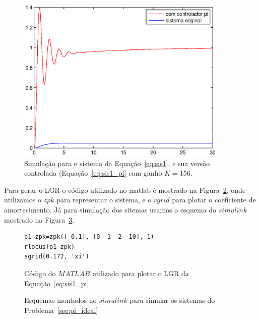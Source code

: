 \documentclass[a4paper]{article}
\begin{document}
\begin{figure}[ht]
   \centering
   \includegraphics[width=0.9\textwidth]{p1_sim}
   \caption{Simulação para o sistema da Equação~\ref{eq:sis1},
      e sua versão controlada (Equação~\ref{eq:sis1_pi} com ganho
      $K=156$.}
   \label{fig:sis1_sim}
\end{figure}

Para gerar o LGR o código utilizado no matlab é mostrado na Figura~\ref{verb:sis1_lgr},
onde utilizamos o $zpk$ para representar o sistema, e o $rgrid$ para plotar o coeficiente
de amortecimento. Já para simulação dos sitemas usamos o esquema do $simulink$ mostrado
na Figura~\ref{fig:sis1_simulink}.

\begin{figure}[ht]
\begin{verbatim}
p1_zpk=zpk([-0.1], [0 -1 -2 -10], 1)
rlocus(p1_zpk)
sgrid(0.172, 'xi')
\end{verbatim}
\caption{Código do $MATLAB$ utilizado para plotar o LGR da Equação~\ref{eq:sis1_pi}}
\label{verb:sis1_lgr}
\end{figure}

\begin{figure}[ht]
   \caption{Esquemas montados no $simulink$ para simular os sistemas
      do Problema~\ref{sec:pi_ideal}}
   \label{fig:sis1_simulink}
\end{figure}


 
\end{document}
